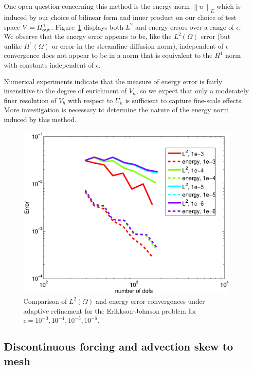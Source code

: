 \documentclass[final,leqno]{siamltex}
\newcommand{\nor}[1]{\left\| #1 \right\|}
\newcommand{\LRp}[1]{\left( #1 \right)}
\renewcommand{\L}{L^2\LRp{\Omega}}
\begin{document}
One open question concerning this method is the energy norm $\nor{u}_E$ which is induced by our choice of bilinear form and inner product on our choice of test space $V = H^1_{\rm out}$.  Figure~\ref{fig:erikksonEpsComparison} displays both $L^2$ and energy errors over a range of $\epsilon$.  We observe that the energy error appears to be, like the $\L$ error (but unlike $H^1(\Omega)$ or error in the streamline diffusion norm), independent of $\epsilon$ -- convergence does not appear to be in a norm that is equivalent to the $H^1$ norm with constants independent of $\epsilon$.  

Numerical experiments indicate that the measure of energy error is fairly insensitive to the degree of enrichment of $V_h$, so we expect that only a moderately finer resolution of $V_h$ with respect to $U_h$ is sufficient to capture fine-scale effects.  More investigation is necessary to determine the nature of the energy norm induced by this method.  

\begin{figure}[!h]
\centering
\includegraphics[scale=.6]{figs/rates/epsRangeComparison.eps}
\caption{Comparison of $\L$ and energy error convergences under adaptive refinement for the Erikkson-Johnson problem for $\epsilon = 10^{-3}, 10^{-4}, 10^{-5}, 10^{-6}$.}
\label{fig:erikksonEpsComparison}
\end{figure}

\subsection{Discontinuous forcing and advection skew to mesh}
\end{document}
